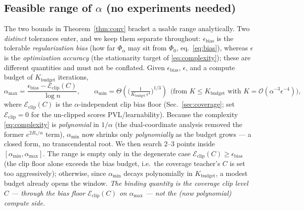 \documentclass[11pt]{article}
\begin{document}
\subsection{Feasible range of $\alpha$ (no experiments needed)}
\label{sec:alpha-range}
The two bounds in Theorem~\ref{thm:conv} bracket a usable range analytically. Two \emph{distinct} tolerances enter, and we keep them separate throughout: $\epsilon_{\mathrm{bias}}$ is the tolerable \emph{regularization bias} (how far $\Phi_\alpha$ may sit from $\Phi_0$, eq.~\eqref{eq:bias}), whereas $\epsilon$ is the \emph{optimization accuracy} (the stationarity target of \eqref{eq:complexity}); these are different quantities and must not be conflated. Given $\epsilon_{\mathrm{bias}}$, $\epsilon$, and a compute budget of $K_{\mathrm{budget}}$ iterations,
\begin{equation}
  \alpha_{\max}=\frac{\epsilon_{\mathrm{bias}}-\mathcal{E}_{\mathrm{clip}}(C)}{\log n},
  \qquad
  \alpha_{\min}=\Theta\!\left(\Big(\tfrac{1}{K_{\mathrm{budget}}\,\epsilon^{4}}\Big)^{1/3}\right)
  \ \ \text{(from }K\le K_{\mathrm{budget}}\text{ with }K=\mathcal{O}(\alpha^{-3}\epsilon^{-4})\text{)},
  \label{eq:alpha-range}
\end{equation}
where $\mathcal{E}_{\mathrm{clip}}(C)$ is the $\alpha$-independent clip bias floor (Sec.~\ref{sec:coverage}; set $\mathcal{E}_{\mathrm{clip}}=0$ for the un-clipped scores PVL/learnability). Because the complexity \eqref{eq:complexity} is \emph{polynomial} in $1/\alpha$ (the dual-coordinate analysis removed the former $e^{2B_s/\alpha}$ term), $\alpha_{\min}$ now shrinks only \emph{polynomially} as the budget grows --- a closed form, no transcendental root. We then search $2$--$3$ points inside $[\alpha_{\min},\alpha_{\max}]$. The range is empty only in the degenerate case $\mathcal{E}_{\mathrm{clip}}(C)\ge\epsilon_{\mathrm{bias}}$ (the clip floor alone exceeds the bias budget, i.e.\ the coverage teacher's $C$ is set too aggressively); otherwise, since $\alpha_{\min}$ decays polynomially in $K_{\mathrm{budget}}$, a modest budget already opens the window. \emph{The binding quantity is the coverage clip level $C$ --- through the bias floor $\mathcal{E}_{\mathrm{clip}}(C)$ on $\alpha_{\max}$ --- not the (now polynomial) compute side.}
\end{document}
